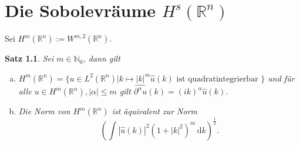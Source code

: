 \documentclass[
paper=a4,
bibtotocnumbered,
liststotocnumbered,
tablecaptionabove,
pointlessnumbers,
twoside,
openright,
10pt
]
{report}
\newtheorem{satz}[thm]{Satz}
\theoremstyle{definition}
\numberwithin{equation}{chapter}
\begin{document}
\chapter{Die Sobolevräume $H^s(\mathbb R^n)$}
Sei $H^m(\mathbb R^n) := W^{m,2}(\mathbb R^n)$.
\begin{satz}
Sei $m\in \mathbb N_0$, dann gilt
\begin{enumerate}[(a)]
\item $H^m(\mathbb R^n) = \{ u\in L^2(\mathbb R^n)| k \mapsto |k|^m \hat u(k) \text{ ist quadratintegrierbar } \}$ und für alle $u\in H^m(\mathbb R^n), |\alpha|\le m$ gilt $\widehat{\partial^\alpha u} (k) = (ik)^\alpha \hat u(k)$.
\item Die Norm von $H^m(\mathbb R^n)$ ist äquivalent zur Norm
\begin{equation}
\left ( \int |\hat u(k)|^2 (1+|k|^2)^m \, \mathrm dk \right )^{\frac{1}{2}}.
\end{equation}
\end{enumerate}
\end{satz}
\end{document}
